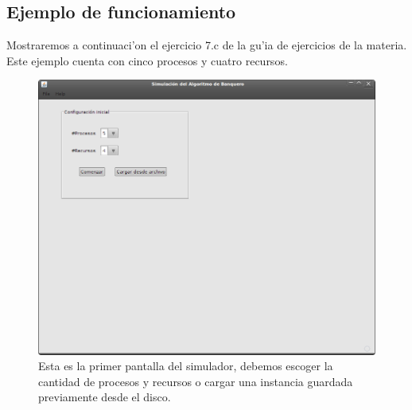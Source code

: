 \newpage
\subsection{Ejemplo de funcionamiento}
Mostraremos a continuaci'on el ejercicio 7.c de la gu'ia de ejercicios de la materia. 
Este ejemplo cuenta con cinco procesos y cuatro recursos.

\begin{figure}[h!]
\begin{center}
 \includegraphics[scale=0.3,keepaspectratio=true]{./imagenes/banquero/banquero1.png}
 \caption{Esta es la primer pantalla del simulador, debemos escoger la cantidad de procesos y recursos o cargar una instancia guardada previamente desde el disco.}
\end{center}
\end{figure}

